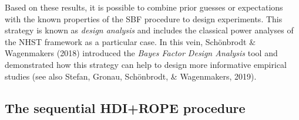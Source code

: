 \documentclass[a4paper,jou,natbib,floatsintext,donotrepeattitle]{apa6}
\begin{document}
Based on these results, it is possible to combine prior guesses or expectations with the known properties of the SBF procedure to design experiments. This strategy is known as \textit{design analysis} and includes the classical power analyses of the NHST framework as a particular case. In this vein, Schönbrodt \& Wagenmakers (2018) introduced the \textit{Bayes Factor Design Analysis} tool and demonstrated how this strategy can help to design more informative empirical studies (see also Stefan, Gronau, Schönbrodt, \& Wagenmakers, 2019).



\subsection{The sequential HDI+ROPE procedure}
\end{document}
